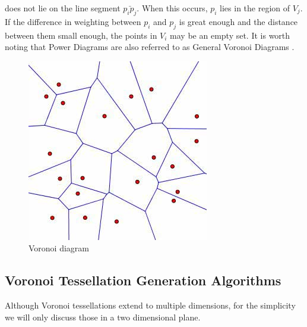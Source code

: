 %
does not lie on the line segment $\bar{p_ip_j}$. When this occurs, $p_i$ lies in the region of $V_j$. If the difference in weighting between $p_i$ and $p_j$ is great enough and the distance between them small enough, the points in $V_i$ may be an empty set. It is worth noting that Power Diagrams are also referred to as General Voronoi Diagrams \citep{aurenhammer1987power}.
%
%
\begin{figure}[H]
    \centering
    \includegraphics[scale=0.65]{Images/voronoi.jpg}
    \caption[]{Voronoi diagram\footnotemark}
    \label{tes:fig:voreg}
\end{figure}
\subsection{Voronoi Tessellation Generation Algorithms}\label{tes:sec:tga}
Although Voronoi tessellations extend to multiple dimensions, for the simplicity we will only discuss those in a two dimensional plane.
%
